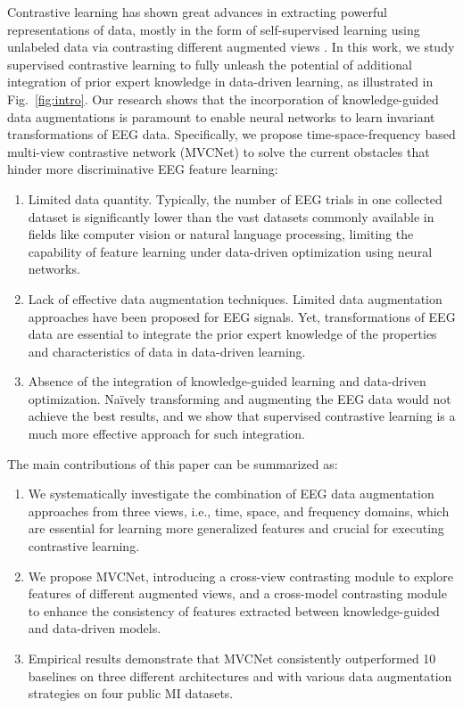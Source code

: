 \documentclass[journal]{IEEEtran}
\begin{document}
Contrastive learning has shown great advances in extracting powerful representations of data, mostly in the form of self-supervised learning using unlabeled data via contrasting different augmented views \cite{simclr2020,he2020moco,infomax2018}. In this work, we study supervised contrastive learning to fully unleash the potential of additional integration of prior expert knowledge in data-driven learning, as illustrated in Fig.~\ref{fig:intro}. Our research shows that the incorporation of knowledge-guided data augmentations is paramount to enable neural networks to learn invariant transformations of EEG data. Specifically, we propose time-space-frequency based multi-view contrastive network (MVCNet) to solve the current obstacles that hinder more discriminative EEG feature learning:
\begin{enumerate}
\item Limited data quantity. Typically, the number of EEG trials in one collected dataset is significantly lower than the vast datasets commonly available in fields like computer vision or natural language processing, limiting the capability of feature learning under data-driven optimization using neural networks.
\item Lack of effective data augmentation techniques. Limited data augmentation approaches have been proposed for EEG signals. Yet, transformations of EEG data are essential to integrate the prior expert knowledge of the properties and characteristics of data in data-driven learning.
\item Absence of the integration of knowledge-guided learning and data-driven optimization. Na\"ively transforming and augmenting the EEG data would not achieve the best results, and we show that supervised contrastive learning is a much more effective approach for such integration.
\end{enumerate}

The main contributions of this paper can be summarized as:
\begin{enumerate}
\item We systematically investigate the combination of EEG data augmentation approaches from three views, i.e., time, space, and frequency domains, which are essential for learning more generalized features and crucial for executing contrastive learning. 
\item We propose MVCNet, introducing a cross-view contrasting module to explore features of different augmented views, and a cross-model contrasting module to enhance the consistency of features extracted between knowledge-guided and data-driven models. 
\item Empirical results demonstrate that MVCNet consistently outperformed 10 baselines on three different architectures and with various data augmentation strategies on four public MI datasets.
\end{enumerate}
\end{document}

